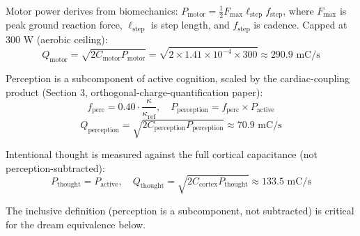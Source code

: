 \begin{definition}
Motor power derives from biomechanics: $P_{\text{motor}} = \frac{1}{2} F_{\max} \ell_{\text{step}} f_{\text{step}}$, where $F_{\max}$ is peak ground reaction force, $\ell_{\text{step}}$ is step length, and $f_{\text{step}}$ is cadence. Capped at 300 W (aerobic ceiling):
\begin{equation}
Q_{\text{motor}} = \sqrt{2 C_{\text{motor}} P_{\text{motor}}} = \sqrt{2 \times 1.41 \times 10^{-4} \times 300} \approx 290.9 \text{ mC/s}
\end{equation}
\end{definition}

\begin{definition}
Perception is a subcomponent of active cognition, scaled by the cardiac-coupling product (Section 3, orthogonal-charge-quantification paper):
\begin{equation}
f_{\text{perc}} = 0.40 \cdot \frac{\kappa}{\kappa_{\text{ref}}}, \quad P_{\text{perception}} = f_{\text{perc}} \times P_{\text{active}}
\end{equation}
\begin{equation}
Q_{\text{perception}} = \sqrt{2 C_{\text{perception}} P_{\text{perception}}} \approx 70.9 \text{ mC/s}
\end{equation}
\end{definition}

\begin{definition}
Intentional thought is measured against the full cortical capacitance (not perception-subtracted):
\begin{equation}
P_{\text{thought}} = P_{\text{active}}, \quad Q_{\text{thought}} = \sqrt{2 C_{\text{cortex}} P_{\text{thought}}} \approx 133.5 \text{ mC/s}
\end{equation}

The inclusive definition (perception is a subcomponent, not subtracted) is critical for the dream equivalence below.
\end{definition}

